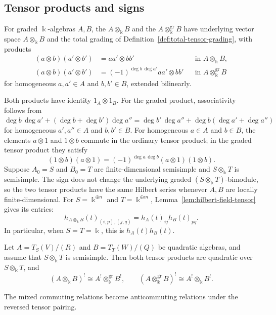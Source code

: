 \begin{advanced}[suppressfirstparskip=true,innertopmargin=0pt]
\subsection{Tensor products and signs}

\begin{definition}\label{def:algebra-tensor-products}
For graded $\Bbbk$-algebras $A,B$, the  $A\otimes_\Bbbk B$ and the  $A\otimes_\Bbbk^{\mathrm{gr}}B$ have underlying vector space $A\otimes_\Bbbk B$ and the total grading of Definition~\ref{def:total-tensor-grading}, with products
\begin{equation}\label{eq:signed-tensor-product}
\begin{aligned}
(a\otimes b)(a'\otimes b')&=aa'\otimes bb'
&&\text{in }A\otimes_\Bbbk B,\\
(a\otimes b)(a'\otimes b')&=(-1)^{\deg b\,\deg a'}aa'\otimes bb'
&&\text{in }A\otimes_\Bbbk^{\mathrm{gr}}B
\end{aligned}
\end{equation}
for homogeneous $a,a'\in A$ and $b,b'\in B$, extended bilinearly.
\end{definition}

Both products have identity $1_A\otimes1_B$.
For the graded product, associativity follows from
$\deg b\,\deg a'+(\deg b+\deg b')\deg a''=\deg b'\,\deg a''+\deg b(\deg a'+\deg a'')$
for homogeneous $a',a''\in A$ and $b,b'\in B$.
For homogeneous $a\in A$ and $b\in B$, the elements $a\otimes1$ and $1\otimes b$ commute in the ordinary tensor product; in the graded tensor product they satisfy
\[
(1\otimes b)(a\otimes1)=(-1)^{\deg a\,\deg b}(a\otimes1)(1\otimes b).
\]
Suppose $A_0=S$ and $B_0=T$ are finite-dimensional semisimple and $S\otimes_\Bbbk T$ is semisimple.
The sign does not change the underlying graded $(S\otimes_\Bbbk T)$-bimodule, so the two tensor products have the same Hilbert series whenever $A,B$ are locally finite-dimensional.
For $S=\Bbbk^{\oplus n}$ and $T=\Bbbk^{\oplus m}$, Lemma~\ref{lem:hilbert-field-tensor} gives its entries:
\[
h_{A\otimes_\Bbbk B}(t)_{(i,p),(j,q)}
=h_A(t)_{ij}h_B(t)_{pq}.
\]
In particular, when $S=T=\Bbbk$, this is $h_A(t)h_B(t)$.

\begin{proposition}\label{prop:dual-tensor-products}
Let $A=T_S(V)/(R)$ and $B=T_T(W)/(Q)$ be quadratic algebras, and assume that $S\otimes_\Bbbk T$ is semisimple.
Then both tensor products are quadratic over $S\otimes_\Bbbk T$, and
\begin{equation}\label{eq:dual-tensor-products}
(A\otimes_\Bbbk B)^!\cong A^!\otimes_\Bbbk^{\mathrm{gr}}B^!,\qquad
(A\otimes_\Bbbk^{\mathrm{gr}}B)^!\cong A^!\otimes_\Bbbk B^!.
\end{equation}
\end{proposition}
The mixed commuting relations become anticommuting relations under the reversed tensor pairing.


\end{advanced}
